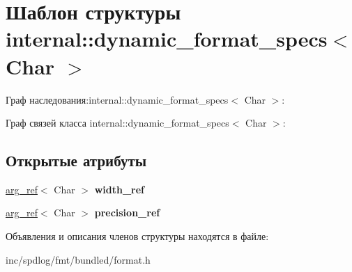 \hypertarget{structinternal_1_1dynamic__format__specs}{}\section{Шаблон структуры internal\+:\+:dynamic\+\_\+format\+\_\+specs$<$ Char $>$}
\label{structinternal_1_1dynamic__format__specs}


Граф наследования\+:internal\+:\+:dynamic\+\_\+format\+\_\+specs$<$ Char $>$\+:


Граф связей класса internal\+:\+:dynamic\+\_\+format\+\_\+specs$<$ Char $>$\+:
\subsection*{Открытые атрибуты}
\begin{DoxyCompactItemize}
\item 
\mbox{\label{structinternal_1_1dynamic__format__specs_a5c7f025d6bfdf67ba9a418299e75b79d}} 
\hyperlink{structinternal_1_1arg__ref}{arg\+\_\+ref}$<$ Char $>$ {\bfseries width\+\_\+ref}
\item 
\mbox{\label{structinternal_1_1dynamic__format__specs_ac1bef81ff1191db1c234854a114b9994}} 
\hyperlink{structinternal_1_1arg__ref}{arg\+\_\+ref}$<$ Char $>$ {\bfseries precision\+\_\+ref}
\end{DoxyCompactItemize}


Объявления и описания членов структуры находятся в файле\+:\begin{DoxyCompactItemize}
\item 
inc/spdlog/fmt/bundled/format.\+h\end{DoxyCompactItemize}

